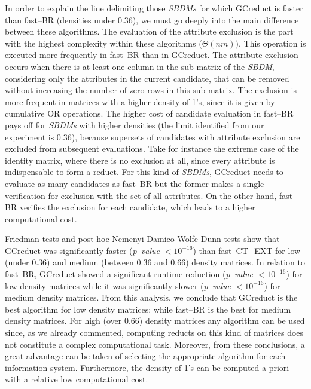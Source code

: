 \documentclass[number,preprint,review,12pt]{elsarticle}
\begin{document}
	In order to explain the line delimiting those \textit{SBDMs} for which GCreduct is faster than fast--BR (densities under 0.36), we must go deeply into the main difference between these algorithms. The evaluation of the attribute exclusion is the part with the highest complexity within these algorithms ($\Theta (nm)$). This operation is executed more frequently in fast--BR than in GCreduct. The attribute exclusion occurs when there is at least one column in the sub-matrix of the \textit{SBDM}, considering only the attributes in the current candidate, that can be removed without increasing the number of zero rows in this sub-matrix. The exclusion is more frequent in matrices with a higher density of 1's, since it is given by cumulative OR operations. The higher cost of candidate evaluation in fast--BR pays off for \textit{SBDMs} with higher densities (the limit identified from our experiment is 0.36), because supersets of candidates with attribute exclusion are excluded from subsequent evaluations. Take for instance the extreme case of the identity matrix, where there is no exclusion at all, since every attribute is indispensable to form a reduct. For this kind of \textit{SBDMs}, GCreduct needs to evaluate as many candidates as fast--BR but the former makes a single verification for exclusion with the set of all attributes. On the other hand, fast--BR verifies the exclusion for each candidate, which leads to a higher computational cost.
	
	Friedman tests and post hoc Nemenyi-Damico-Wolfe-Dunn tests show that GCreduct was significantly faster (\textit{p--value} $< 10^{-16}$) than fast--CT\_EXT for low (under 0.36) and medium (between 0.36 and 0.66) density matrices. In relation to fast--BR, GCreduct showed a significant runtime reduction (\textit{p--value} $< 10^{-16}$) for low density matrices while it was significantly slower (\textit{p--value} $< 10^{-16}$) for medium density matrices. From this analysis, we conclude that GCreduct is the best algorithm for low density matrices; while fast--BR is the best for medium density matrices. For high (over 0.66) density matrices any algorithm can be used since, as we already commented, computing reducts on this kind of matrices does not constitute a complex computational task. Moreover, from these conclusions, a great advantage can be taken of selecting the appropriate algorithm for each information system. Furthermore, the density of 1's can be computed a priori with a relative low computational cost.
		
\end{document}
